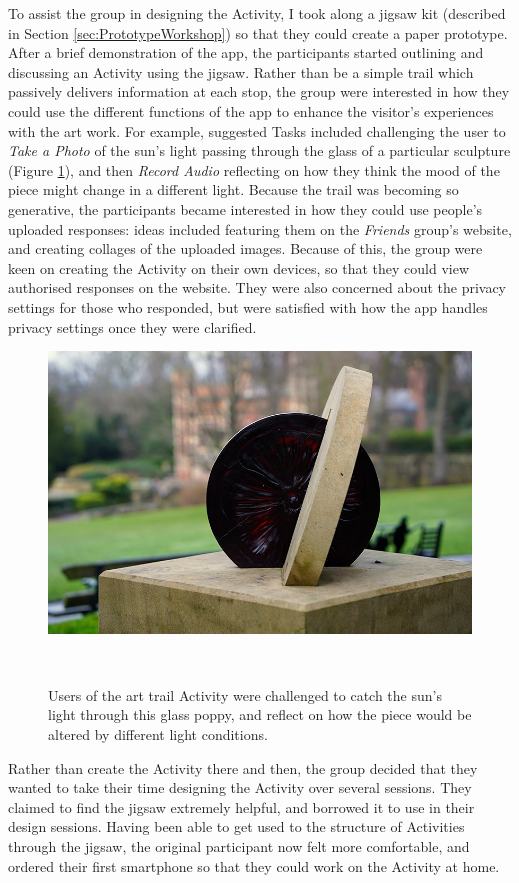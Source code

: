To assist the group in designing the Activity, I took along a jigsaw kit (described in Section \ref{sec:PrototypeWorkshop}) so that they could create a paper prototype. After a brief demonstration of the app, the participants started outlining and discussing an Activity using the jigsaw. Rather than be a simple trail which passively delivers information at each stop, the group were interested in how they could use the different functions of the app to enhance the visitor's experiences with the art work. For example, suggested Tasks included challenging the user to \textit{Take a Photo} of the sun's light passing through the glass of a particular sculpture (Figure \ref{fig:ParkArt}), and then \textit{Record Audio} reflecting on how they think the mood of the piece might change in a different light. Because the trail was becoming so generative, the participants became interested in how they could use people's uploaded responses: ideas included featuring them on the \textit{Friends} group's website, and creating collages of the uploaded images. Because of this, the group were keen on creating the Activity on their own devices, so that they could view authorised responses on the website. They were also concerned about the privacy settings for those who responded, but were satisfied with how the app handles privacy settings once they were clarified.

\begin{figure}
  \centering
  \includegraphics[width=0.75\columnwidth]{images/chapter06/artpiece.jpg}
  \caption[An art piece which was used in an OurPlace Task]{Users of the art trail Activity were challenged to catch the sun's light through this glass poppy, and reflect on how the piece would be altered by different light conditions.}~\label{fig:ParkArt}
\end{figure}

Rather than create the Activity there and then, the group decided that they wanted to take their time designing the Activity over several sessions. They claimed to find the jigsaw extremely helpful, and borrowed it to use in their design sessions. Having been able to get used to the structure of Activities through the jigsaw, the original participant now felt more comfortable, and ordered their first smartphone so that they could work on the Activity at home.

